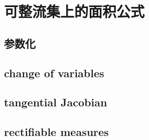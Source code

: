 \section{可整流集上的面积公式}
\label{b1:sec:1903}


\subsection{参数化}
\label{b1:subsec:190301}

\subsection{change of variables}
\label{b1:subsec:190302}

\subsection{tangential Jacobian}
\label{b1:subsec:190303}

\subsection{rectifiable measures}
\label{b1:subsec:190304}


